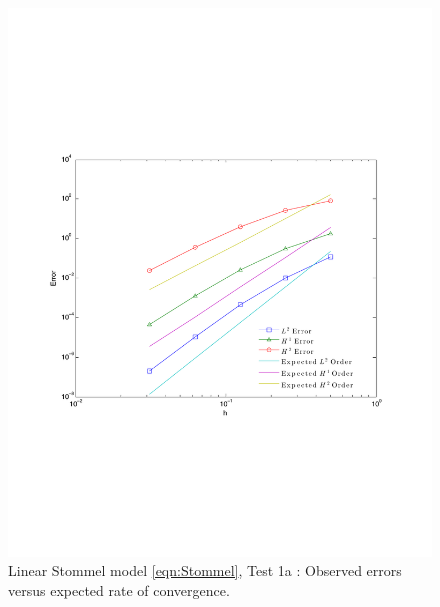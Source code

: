 \begin{figure}
  \begin{center}
    \includegraphics[scale=0.5]{figures/StommelAConvergence.pdf}
    \caption{Linear Stommel model \eqref{eqn:Stommel}, Test 1a \cite{Vallis06}:
      Observed errors versus expected rate of convergence.}
    \label{fig:StommelErrorsVallis}
  \end{center}
\end{figure}

